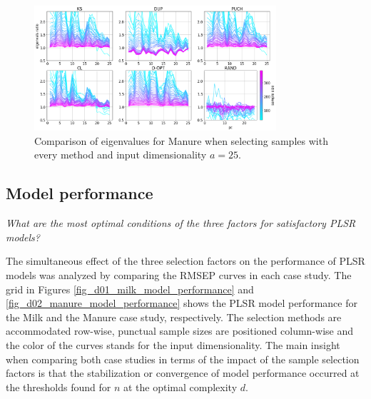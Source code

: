 \documentclass[journal=ancham,manuscript=article]{achemso}
\begin{document}
\begin{figure}[b]
\includegraphics[width=0.8\textwidth]{manuscript/figures/d02_manure_specific_framework_eigenvalsratio.png}
\centering
\caption{Comparison of eigenvalues for Manure when selecting samples with every method and input dimensionality $a=25$.}
\label{fig_d02_manure_specific_framework_eigenvalsratio}
\end{figure}

\subsection*{Model performance}\label{results:modperformance}


\emph{What are the most optimal conditions of the three factors for satisfactory PLSR models?}

The simultaneous effect of the three selection factors on the performance of PLSR models was analyzed by comparing the RMSEP curves in each case study. The grid in Figures \ref{fig_d01_milk_model_performance} and \ref{fig_d02_manure_model_performance} shows the PLSR model performance for the Milk and the Manure case study, respectively. The selection methods are accommodated row-wise, punctual sample sizes are positioned column-wise and the color of the curves stands for the input dimensionality. The main insight when comparing both case studies in terms of the impact of the sample selection factors is that the stabilization or convergence of model performance occurred at the thresholds found for $n$ at the optimal complexity $d$. 
\end{document}
